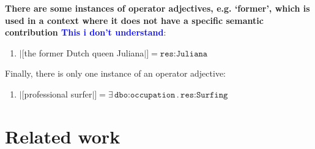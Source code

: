 \documentclass[11pt]{article}
\begin{document}
\vspace{-1.5em}
\textbf{There are some instances of operator adjectives, e.g. `former', which is used in a context 
where it does not have a specific semantic contribution \textcolor{blue}{This i don't understand}}:
\begin{enumerate}
\item $|[$the former Dutch queen Juliana$|]=\texttt{res:Juliana}$
\end{enumerate}

Finally, there is only one instance of an operator adjective:
\begin{enumerate}
\item %
    $|[$professional surfer$|]=\exists\,\texttt{dbo:occupation}\,.\,\texttt{res:Surfing}$
\end{enumerate}





\section{Related work}
\end{document}
